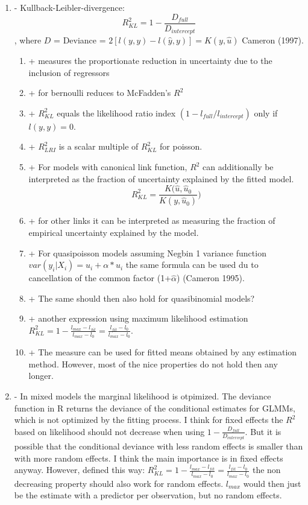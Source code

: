 \documentclass[11pt, a4paper]{article}\usepackage[]{graphicx}\usepackage[]{color}
\begin{document}
\begin {enumerate}

\item[-] Kullback-Leibler-divergence:\begin{equation} R^2_{KL} = 1 - \frac{D_{full}}{D_{intercept}} \end{equation}, where $D$ = Deviance = $ 2[l(y,y) - l(\hat{y},y)] = K(y, \hat{u}) $ Cameron (1997). 

\begin {enumerate}
\item[+] measures the proportionate reduction in uncertainty due to the inclusion of regressors
\item[+] for bernoulli reduces to McFadden's $R^2$
\item[+] $ R^2_{KL} $ equals the likelihood ratio index $ (1 - l_{full}/l_{intercept}) $ only if $ l(y,y) = 0 $. 

\item[+] $R^2_{LRI}$ is a scalar multiple of  $R^2_{KL}$ for poisson.
\item[+] For models with canonical link function, $R^2$ can additionally be interpreted as the fraction of uncertainty explained by the fitted model. \begin{equation} R^2_{KL} = \frac{K(\hat{u}, \hat{u}_{0}}{K(y, \hat{u}_{0})}) \end{equation}
\item[+] for other links it can be interpreted as  measuring the fraction of empirical uncertainty explained by the model.
\item[+] For quasipoisson models assuming Negbin 1 variance function $ var(y_{i}|X_{i}) = u_{i} + \alpha * u_{i}$ the same formula can be used du to cancellation of the common factor (1+$\hat{\alpha}$) (Cameron 1995).
\item[+] The same should then also hold for quasibinomial models?
\item[+] another expression using maximum likelihood estimation $ R^2_{KL} = 1 - \frac{l_{max} - l_{fit}}{l_{max}-l_{0}} = \frac{l_{fit}-l_{0}}{l_{max}-l_{0}}$.
\item[+] The measure can be used for fitted means obtained by any estimation method. However, most of the nice properties do not hold then any longer.

\end{enumerate}

\item[-] In mixed models the marginal likelihood is otpimized. The deviance function in R returns the deviance of the conditional estimates for GLMMs, which is not optimized by the fitting process. I think for fixed effects the $R^2$ based on likelihood should not decrease when using $ 1 - \frac{D_{full}}{D_{intercept}} $. But it is possible that the conditional deviance with less random effects is smaller than with more random effects. I think the main importance is in fixed effects anyway. However, defined this way: $ R^2_{KL} = 1 - \frac{l_{max} - l_{fit}}{l_{max}-l_{0}} = \frac{l_{fit}-l_{0}}{l_{max}-l_{0}}$ the non decreasing property should also work for random effects. $l_{max}$ would then just be the estimate with a predictor per observation, but no random effects.  


\end{enumerate}
\end{document}
